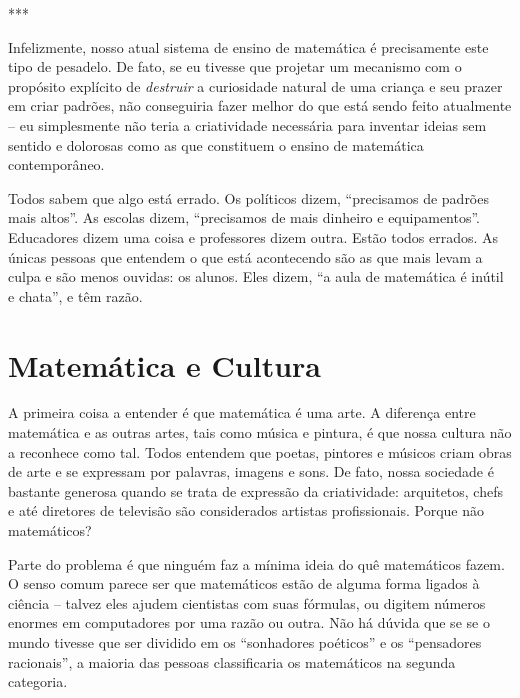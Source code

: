 \documentclass[a4paper,oneside,12pt,notitlepage]{article}
\begin{document}
\vspace{1em}

\begin{center}
***
\end{center}

\vspace{1em}

Infelizmente, nosso atual sistema de ensino de matemática é precisamente este tipo de pesadelo.
De fato, se eu tivesse que projetar um mecanismo com o propósito explícito de \textsl{destruir} a curiosidade natural de uma criança e seu prazer em criar padrões, não conseguiria fazer melhor do que está sendo feito atualmente -- eu simplesmente não teria a criatividade necessária para inventar ideias sem sentido e dolorosas como as que constituem o ensino de matemática contemporâneo.

Todos sabem que algo está errado.
Os políticos dizem, ``precisamos de padrões mais altos''.
As escolas dizem, ``precisamos de mais dinheiro e equipamentos''.
Educadores dizem uma coisa e professores dizem outra.
Estão todos errados.
As únicas pessoas que entendem o que está acontecendo são as que mais levam a culpa e são menos ouvidas: os alunos.
Eles dizem, ``a aula de matemática é inútil e chata'', e têm razão. %

\section*{Matemática e Cultura}

A primeira coisa a entender é que matemática é uma arte.
A diferença entre matemática e as outras artes, tais como música e pintura, é que nossa cultura não a reconhece como tal.
Todos entendem que poetas, pintores e músicos criam obras de arte e se expressam por palavras, imagens e sons.
De fato, nossa sociedade é bastante generosa quando se trata de expressão da criatividade: arquitetos, chefs e até diretores de televisão são considerados artistas profissionais. %
Porque não matemáticos?

Parte do problema é que ninguém faz a mínima ideia do quê matemáticos fazem.
O senso comum parece ser que matemáticos estão de alguma forma ligados à ciência -- talvez eles ajudem cientistas com suas fórmulas, ou digitem números enormes em computadores por uma razão ou outra.
Não há dúvida que se se o mundo tivesse que ser dividido em os ``sonhadores poéticos'' e os ``pensadores racionais'', a maioria das pessoas classificaria os matemáticos na segunda categoria.
\end{document}
